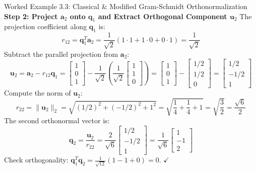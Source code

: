 \begin{examplebox}{Worked Example 3.3: Classical \& Modified Gram-Schmidt Orthonormalization}
\textbf{Step 2: Project $\mathbf{a}_2$ onto $\mathbf{q}_1$ and Extract Orthogonal Component $\mathbf{u}_2$}
The projection coefficient along $\mathbf{q}_1$ is:
\begin{equation*}
r_{12} = \mathbf{q}_1^T \mathbf{a}_2 = \frac{1}{\sqrt{2}}(1 \cdot 1 + 1 \cdot 0 + 0 \cdot 1) = \frac{1}{\sqrt{2}}
\end{equation*}
Subtract the parallel projection from $\mathbf{a}_2$:
\begin{equation*}
\mathbf{u}_2 = \mathbf{a}_2 - r_{12}\mathbf{q}_1 = \begin{bmatrix} 1 \\ 0 \\ 1 \end{bmatrix} - \frac{1}{\sqrt{2}} \left( \frac{1}{\sqrt{2}} \begin{bmatrix} 1 \\ 1 \\ 0 \end{bmatrix} \right) = \begin{bmatrix} 1 \\ 0 \\ 1 \end{bmatrix} - \begin{bmatrix} 1/2 \\ 1/2 \\ 0 \end{bmatrix} = \begin{bmatrix} 1/2 \\ -1/2 \\ 1 \end{bmatrix}
\end{equation*}
Compute the norm of $\mathbf{u}_2$:
\begin{equation*}
r_{22} = \|\mathbf{u}_2\|_2 = \sqrt{(1/2)^2 + (-1/2)^2 + 1^2} = \sqrt{\frac{1}{4} + \frac{1}{4} + 1} = \sqrt{\frac{3}{2}} = \frac{\sqrt{6}}{2}
\end{equation*}
The second orthonormal vector is:
\begin{equation*}
\mathbf{q}_2 = \frac{\mathbf{u}_2}{r_{22}} = \frac{2}{\sqrt{6}} \begin{bmatrix} 1/2 \\ -1/2 \\ 1 \end{bmatrix} = \frac{1}{\sqrt{6}} \begin{bmatrix} 1 \\ -1 \\ 2 \end{bmatrix}
\end{equation*}
Check orthogonality: $\mathbf{q}_1^T \mathbf{q}_2 = \frac{1}{\sqrt{12}}(1 - 1 + 0) = 0$. $\checkmark$


\end{examplebox}
